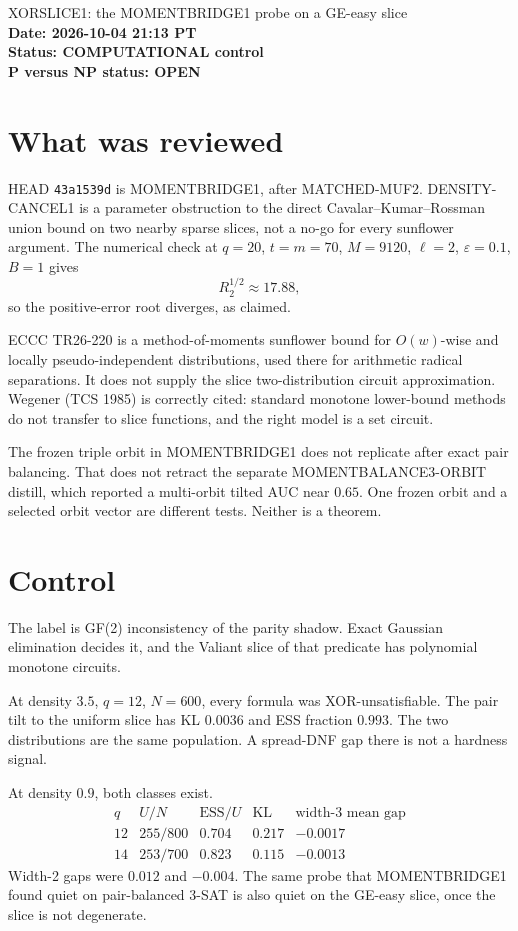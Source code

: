 \documentclass[11pt]{article}
\begin{document}
\begin{center}
{\Large XORSLICE1: the MOMENTBRIDGE1 probe on a GE-easy slice}\\[4pt]
\textbf{Date: 2026-10-04 21:13 PT}\\
\textbf{Status: COMPUTATIONAL control}\\
\textbf{P versus NP status: OPEN}
\end{center}

\section{What was reviewed}
HEAD \texttt{43a1539d} is MOMENTBRIDGE1, after MATCHED-MUF2. DENSITY-CANCEL1 is a parameter obstruction to the direct Cavalar--Kumar--Rossman union bound on two nearby sparse slices, not a no-go for every sunflower argument. The numerical check at \(q=20\), \(t=m=70\), \(M=9120\), \(\ell=2\), \(\varepsilon=0.1\), \(B=1\) gives
\[
R_2^{1/2}\approx 17.88,
\]
so the positive-error root diverges, as claimed.

ECCC TR26-220 is a method-of-moments sunflower bound for \(O(w)\)-wise and locally pseudo-independent distributions, used there for arithmetic radical separations. It does not supply the slice two-distribution circuit approximation. Wegener (TCS 1985) is correctly cited: standard monotone lower-bound methods do not transfer to slice functions, and the right model is a set circuit.

The frozen triple orbit in MOMENTBRIDGE1 does not replicate after exact pair balancing. That does not retract the separate MOMENTBALANCE3-ORBIT distill, which reported a multi-orbit tilted AUC near \(0.65\). One frozen orbit and a selected orbit vector are different tests. Neither is a theorem.

\section{Control}
The label is GF(2) inconsistency of the parity shadow. Exact Gaussian elimination decides it, and the Valiant slice of that predicate has polynomial monotone circuits.

At density \(3.5\), \(q=12\), \(N=600\), every formula was XOR-unsatisfiable. The pair tilt to the uniform slice has KL \(0.0036\) and ESS fraction \(0.993\). The two distributions are the same population. A spread-DNF gap there is not a hardness signal.

At density \(0.9\), both classes exist.
\[
\begin{array}{c|c|c|c|c}
q&U/N&\mathrm{ESS}/U&\mathrm{KL}&\text{width-3 mean gap}\\
\hline
12&255/800&0.704&0.217&-0.0017\\
14&253/700&0.823&0.115&-0.0013
\end{array}
\]
Width-2 gaps were \(0.012\) and \(-0.004\). The same probe that MOMENTBRIDGE1 found quiet on pair-balanced 3-SAT is also quiet on the GE-easy slice, once the slice is not degenerate.
\end{document}

